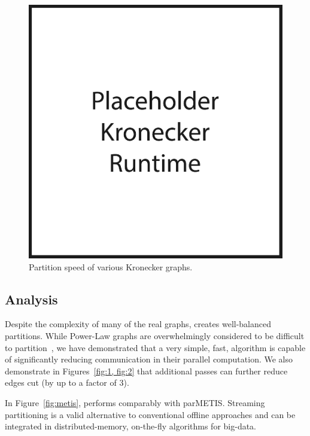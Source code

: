 \begin{figure}[h!]
\centering
  \includegraphics[width=0.8\columnwidth]{figures/kronecker_speed_tests.pdf}
  \caption{Partition speed of various Kronecker graphs.}
  \label{fig:kronspeed}
\end{figure}


\subsection{Analysis}
Despite the complexity of many of the real graphs, \ourmethod creates well-balanced partitions.
While Power-Law graphs are overwhelmingly considered to be difficult to partition~\cite{Abou-Rjeili:2006:MAP:1898953.1899055}, we have demonstrated that a very simple, fast, algorithm is capable of significantly reducing communication in their parallel computation. 
We also demonstrate in Figures~\ref{fig:1, fig:2} that additional passes can further reduce edges cut (by up to a factor of 3). 

In Figure~\ref{fig:metis}, \ourmethod performs comparably with parMETIS.  
Streaming partitioning is a valid alternative to conventional offline approaches and can be integrated in distributed-memory, on-the-fly algorithms for big-data.

